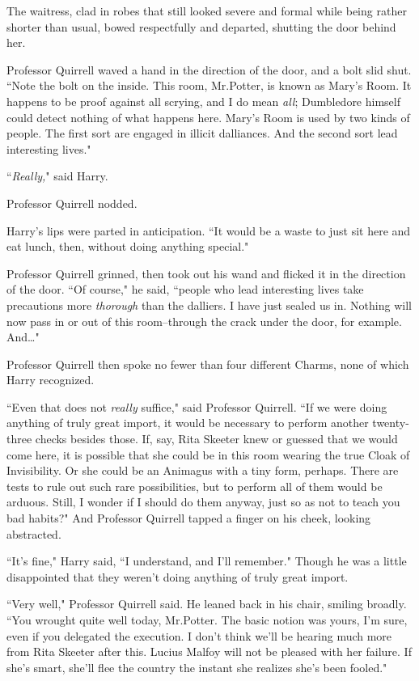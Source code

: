 The waitress, clad in robes that still looked severe and formal while being rather shorter than usual, bowed respectfully and departed, shutting the door behind her.

Professor Quirrell waved a hand in the direction of the door, and a bolt slid shut. ``Note the bolt on the inside. This room, Mr.\?Potter, is known as Mary's Room. It happens to be proof against all scrying, and I do mean \emph{all}; Dumbledore himself could detect nothing of what happens here. Mary's Room is used by two kinds of people. The first sort are engaged in illicit dalliances. And the second sort lead interesting lives."

``\emph{Really,}" said Harry.

Professor Quirrell nodded.

Harry's lips were parted in anticipation. ``It would be a waste to just sit here and eat lunch, then, without doing anything special."

Professor Quirrell grinned, then took out his wand and flicked it in the direction of the door. ``Of course," he said, ``people who lead interesting lives take precautions more \emph{thorough} than the dalliers. I have just sealed us in. Nothing will now pass in or out of this room\---through the crack under the door, for example. And{\ldots}"

Professor Quirrell then spoke no fewer than four different Charms, none of which Harry recognized.

``Even that does not \emph{really} suffice," said Professor Quirrell. ``If we were doing anything of truly great import, it would be necessary to perform another twenty-three checks besides those. If, say, Rita Skeeter knew or guessed that we would come here, it is possible that she could be in this room wearing the true Cloak of Invisibility. Or she could be an Animagus with a tiny form, perhaps. There are tests to rule out such rare possibilities, but to perform all of them would be arduous. Still, I wonder if I should do them anyway, just so as not to teach you bad habits?" And Professor Quirrell tapped a finger on his cheek, looking abstracted.

``It's fine," Harry said, ``I understand, and I'll remember." Though he was a little disappointed that they weren't doing anything of truly great import.

``Very well," Professor Quirrell said. He leaned back in his chair, smiling broadly. ``You wrought quite well today, Mr.\?Potter. The basic notion was yours, I'm sure, even if you delegated the execution. I don't think we'll be hearing much more from Rita Skeeter after this. Lucius Malfoy will not be pleased with her failure. If she's smart, she'll flee the country the instant she realizes she's been fooled."

